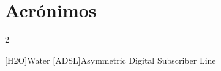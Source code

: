 \chapter{Acrónimos}

\footnotesize
\SingleSpacing

\begin{multicols}{2}
\begin{acronym}[AAAAAA] %

	[H2O]{Water}
	[ADSL]{Asymmetric Digital Subscriber Line}

\end{acronym}
\end{multicols}

